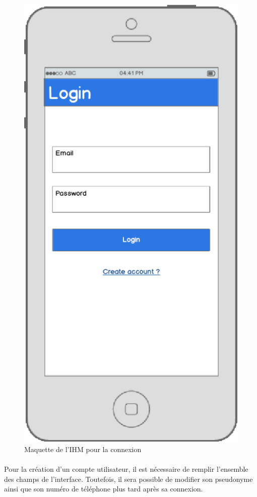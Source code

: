 \documentclass[titlepage, 12pt]{report}
\begin{document}
\begin{figure}[!h]
	\caption{Maquette de l'IHM pour la connexion}
	\label{login}
	\centering
	\includegraphics[scale=0.2]{images/mockups/login.png}
\end{figure}

\clearpage

\paragraph{}Pour la création d'un compte utilisateur, il est nécessaire de remplir l'ensemble des champs de l'interface. Toutefois, il sera possible de modifier son pseudonyme ainsi que son numéro de téléphone plus tard après sa connexion.
\end{document}
